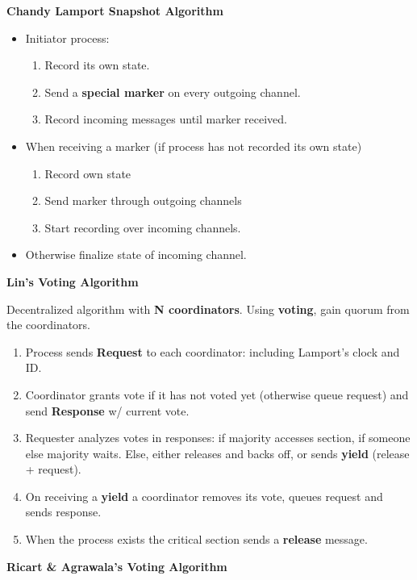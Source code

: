 \documentclass[a4paper, 10pt, twocolumn]{article}
\begin{document}
    \textbf{Chandy Lamport Snapshot Algorithm}

    \begin{itemize}
        \item Initiator process:
        \begin{enumerate}
            \item Record its own state.
            \item Send a \textbf{special marker} on every outgoing channel.
            \item Record incoming messages until marker received.
        \end{enumerate}
        \item When receiving a marker (if process has not recorded its own state)
        \begin{enumerate}
            \item Record own state
            \item Send marker through outgoing channels
            \item Start recording over incoming channels.
        \end{enumerate}
        \item Otherwise finalize state of incoming channel.
    \end{itemize}


    \textbf{Lin's Voting Algorithm}
    
    Decentralized algorithm with \textbf{N coordinators}.
    Using \textbf{voting}, gain quorum from the coordinators.
    \begin{enumerate}
        \item Process sends \textbf{Request} to each coordinator: including Lamport's clock and ID.
        \item Coordinator grants vote if it has not voted yet (otherwise queue request) and send \textbf{Response} w/ current vote.
        \item Requester analyzes votes in responses: if majority accesses section, if someone else majority waits. Else, either releases and backs off, or sends \textbf{yield} (release + request).
        \item On receiving a \textbf{yield} a coordinator removes its vote, queues request and sends response.
        \item When the process exists the critical section sends a \textbf{release} message.
    \end{enumerate}

    \textbf{Ricart \& Agrawala's Voting Algorithm}
\end{document}
